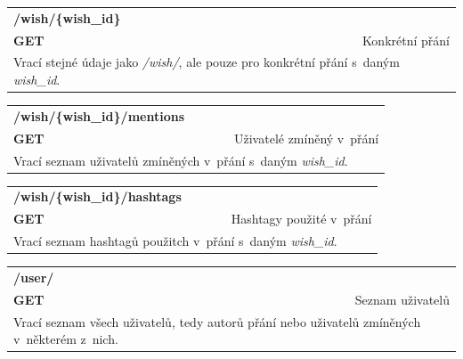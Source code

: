 \documentclass[thesis=B,czech]{FITthesis}[2012/06/26]
\begin{document}
\begin{table}[h]
\begin{tabular}{llllr}
\rowcolor[HTML]{EFEFEF}
\large \textbf{/wish/\{wish\_id\}}        &         &                 &        & \multicolumn{1}{l}{}                \\
\rowcolor[HTML]{EFEFEF}
\textbf{GET}          &         &                 &        & Konkrétní přání                        \\
\multicolumn{5}{l}{\parbox[t]{12.8cm}{Vrací stejné údaje jako \textit{/wish/}, ale pouze pro konkrétní přání s~daným \textit{wish\_id}.}  } \\  
\end{tabular}
\end{table}
 

\begin{table}[h]
\begin{tabular}{llllr}
\rowcolor[HTML]{EFEFEF}
\large \textbf{/wish/\{wish\_id\}/mentions}        &         &                 &        & \multicolumn{1}{l}{}                \\
\rowcolor[HTML]{EFEFEF}
\textbf{GET}          &         &                 &        & Uživatelé zmíněný v~přání                        \\
\multicolumn{5}{l}{\parbox[t]{12.8cm}{Vrací seznam uživatelů zmíněných v~přání s~daným \textit{wish\_id}.}  } \\    
\end{tabular}
\end{table}


\begin{table}[h]
\begin{tabular}{llllr}
\rowcolor[HTML]{EFEFEF}
\large \textbf{/wish/\{wish\_id\}/hashtags}        &         &                 &        & \multicolumn{1}{l}{}                \\
\rowcolor[HTML]{EFEFEF}
\textbf{GET}          &         &                 &        & Hashtagy použité v~přání                        \\
\multicolumn{5}{l}{\parbox[t]{12.8cm}{Vrací seznam hashtagů použitch v~přání s~daným \textit{wish\_id}.}  } \\    
\end{tabular}
\end{table}

\begin{table}[h]
\begin{tabular}{llllr}
\rowcolor[HTML]{EFEFEF}
\large \textbf{/user/}        &         &                 &        & \multicolumn{1}{l}{}                \\
\rowcolor[HTML]{EFEFEF}
\textbf{GET}          &         &                 &        & Seznam uživatelů                        \\
\multicolumn{5}{l}{\parbox[t]{12.8cm}{Vrací seznam všech uživatelů, tedy autorů přání nebo uživatelů zmíněných v~některém z~nich. }  } \\   
\end{tabular}
\end{table}
\end{document}
